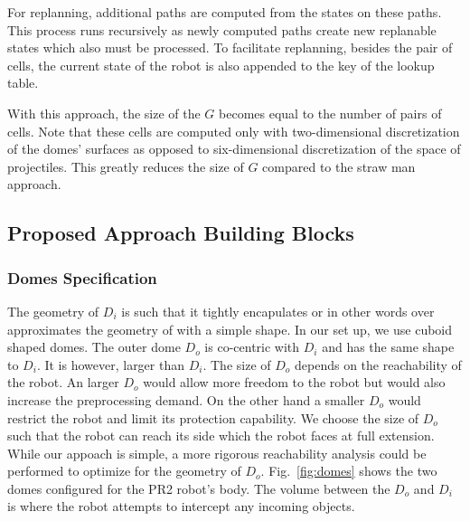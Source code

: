\documentclass[a4paper]{report}
\begin{document}
For replanning, additional paths are computed from the states on these paths. This process runs recursively as newly computed paths create new replanable states which also must be processed. To facilitate replanning, besides the pair of cells, the current state \Sstart of the robot is also appended to the key of the lookup table.

With this approach, the size of the $G$ becomes equal to the number of pairs of cells. Note that these cells are computed only with two-dimensional discretization of the domes' surfaces as opposed to six-dimensional discretization of the space of projectiles. This greatly reduces the size of $G$ compared to the straw man approach.

\subsection{Proposed Approach Building Blocks}
\subsubsection{Domes Specification}
The geometry of $D_i$ is such that it tightly encapulates \calB or in other words over approximates the geometry of \calB with a simple shape. In our set up, we use cuboid shaped domes. The outer dome $D_o$ is co-centric with $D_i$ and has the same shape to $D_i$. It is however, larger than $D_i$. The size of $D_o$ depends on the reachability of the robot. An larger $D_o$ would allow more freedom to the robot but would also increase the preprocessing demand. On the other hand a smaller $D_o$ would restrict the robot and limit its protection capability.
We choose the size of $D_o$ such that the robot can reach its side which the robot faces at full extension. While our appoach is simple, a more rigorous reachability analysis could be performed to optimize for the geometry of $D_o$.
Fig.~\ref{fig:domes} shows the two domes configured for the PR2 robot's body. The volume between the $D_o$ and $D_i$ is where the robot attempts to intercept any incoming objects. 
\end{document}
